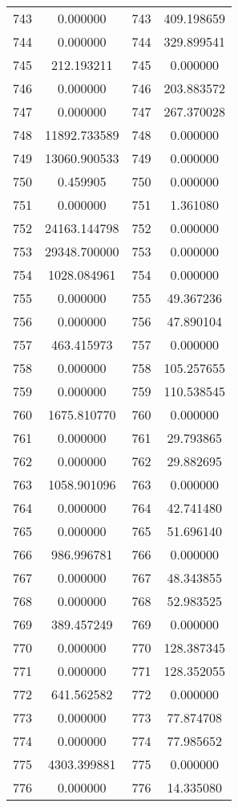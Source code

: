 \documentclass[12pt]{article}
\begin{document}
\begin{longtable}{@{}cccc@{}}
743 & 0.000000 & 743 & 409.198659 \\
744 & 0.000000 & 744 & 329.899541 \\
745 & 212.193211 & 745 & 0.000000 \\
746 & 0.000000 & 746 & 203.883572 \\
747 & 0.000000 & 747 & 267.370028 \\
748 & 11892.733589 & 748 & 0.000000 \\
749 & 13060.900533 & 749 & 0.000000 \\
750 & 0.459905 & 750 & 0.000000 \\
751 & 0.000000 & 751 & 1.361080 \\
752 & 24163.144798 & 752 & 0.000000 \\
753 & 29348.700000 & 753 & 0.000000 \\
754 & 1028.084961 & 754 & 0.000000 \\
755 & 0.000000 & 755 & 49.367236 \\
756 & 0.000000 & 756 & 47.890104 \\
757 & 463.415973 & 757 & 0.000000 \\
758 & 0.000000 & 758 & 105.257655 \\
759 & 0.000000 & 759 & 110.538545 \\
760 & 1675.810770 & 760 & 0.000000 \\
761 & 0.000000 & 761 & 29.793865 \\
762 & 0.000000 & 762 & 29.882695 \\
763 & 1058.901096 & 763 & 0.000000 \\
764 & 0.000000 & 764 & 42.741480 \\
765 & 0.000000 & 765 & 51.696140 \\
766 & 986.996781 & 766 & 0.000000 \\
767 & 0.000000 & 767 & 48.343855 \\
768 & 0.000000 & 768 & 52.983525 \\
769 & 389.457249 & 769 & 0.000000 \\
770 & 0.000000 & 770 & 128.387345 \\
771 & 0.000000 & 771 & 128.352055 \\
772 & 641.562582 & 772 & 0.000000 \\
773 & 0.000000 & 773 & 77.874708 \\
774 & 0.000000 & 774 & 77.985652 \\
775 & 4303.399881 & 775 & 0.000000 \\
776 & 0.000000 & 776 & 14.335080 \\

\end{longtable}
\end{document}
